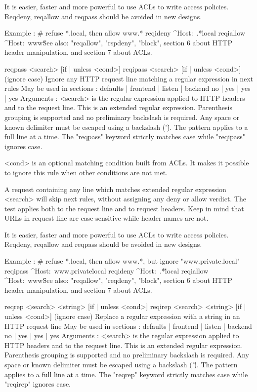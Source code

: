   It is easier, faster and more powerful to use ACLs to write access policies.
  Reqdeny, reqallow and reqpass should be avoided in new designs.

  Example :
     # refuse *.local, then allow www.*
     reqideny  ^Host:\ .*\.local
     reqiallow ^Host:\ www\.

  See also: "reqallow", "rspdeny", "block", section 6 about HTTP header
            manipulation, and section 7 about ACLs.


reqpass  <search> [{if | unless} <cond>]
reqipass <search> [{if | unless} <cond>]  (ignore case)
  Ignore any HTTP request line matching a regular expression in next rules
  May be used in sections :   defaults | frontend | listen | backend
                                 no    |    yes   |   yes  |   yes
  Arguments :
    <search>  is the regular expression applied to HTTP headers and to the
              request line. This is an extended regular expression. Parenthesis
              grouping is supported and no preliminary backslash is required.
              Any space or known delimiter must be escaped using a backslash
              ('\'). The pattern applies to a full line at a time. The
              "reqpass" keyword strictly matches case while "reqipass" ignores
              case.

    <cond>    is an optional matching condition built from ACLs. It makes it
              possible to ignore this rule when other conditions are not met.

  A request containing any line which matches extended regular expression
  <search> will skip next rules, without assigning any deny or allow verdict.
  The test applies both to the request line and to request headers. Keep in
  mind that URLs in request line are case-sensitive while header names are not.

  It is easier, faster and more powerful to use ACLs to write access policies.
  Reqdeny, reqallow and reqpass should be avoided in new designs.

  Example :
     # refuse *.local, then allow www.*, but ignore "www.private.local"
     reqipass  ^Host:\ www.private\.local
     reqideny  ^Host:\ .*\.local
     reqiallow ^Host:\ www\.

  See also: "reqallow", "reqdeny", "block", section 6 about HTTP header
            manipulation, and section 7 about ACLs.


reqrep  <search> <string> [{if | unless} <cond>]
reqirep <search> <string> [{if | unless} <cond>]   (ignore case)
  Replace a regular expression with a string in an HTTP request line
  May be used in sections :   defaults | frontend | listen | backend
                                 no    |    yes   |   yes  |   yes
  Arguments :
    <search>  is the regular expression applied to HTTP headers and to the
              request line. This is an extended regular expression. Parenthesis
              grouping is supported and no preliminary backslash is required.
              Any space or known delimiter must be escaped using a backslash
              ('\'). The pattern applies to a full line at a time. The "reqrep"
              keyword strictly matches case while "reqirep" ignores case.

